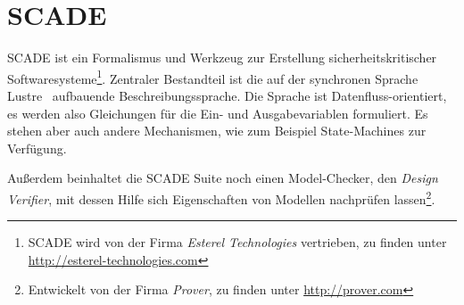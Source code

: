 \section{SCADE}
SCADE ist ein Formalismus und Werkzeug zur Erstellung sicherheitskritischer Softwaresysteme\footnote{SCADE wird von der Firma \emph{Esterel Technologies} vertrieben, zu finden unter \url{http://esterel-technologies.com}}.
Zentraler Bestandteil ist die auf der synchronen Sprache Lustre~\cite{lustre} aufbauende Beschreibungssprache.
Die Sprache ist Datenfluss-orientiert, es werden also Gleichungen für die Ein- und Ausgabevariablen formuliert.
Es stehen aber auch andere Mechanismen, wie zum Beispiel State-Machines zur Verfügung.

Außerdem beinhaltet die SCADE Suite noch einen Model-Checker, den \emph{Design Verifier}, mit dessen Hilfe sich Eigenschaften von Modellen nachprüfen lassen\footnote{Entwickelt von der Firma \emph{Prover}, zu finden unter \url{http://prover.com}}.